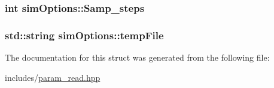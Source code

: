 \subsubsection[{\texorpdfstring{Samp\+\_\+steps}{Samp_steps}}]{\setlength{\rightskip}{0pt plus 5cm}int sim\+Options\+::\+Samp\+\_\+steps}\hypertarget{structsimOptions_a5890487eea2252d4d84f67615269128f}{}\label{structsimOptions_a5890487eea2252d4d84f67615269128f}
\subsubsection[{\texorpdfstring{temp\+File}{tempFile}}]{\setlength{\rightskip}{0pt plus 5cm}std\+::string sim\+Options\+::temp\+File}\hypertarget{structsimOptions_a42a20f246c7029967d29a15e4d5aac16}{}\label{structsimOptions_a42a20f246c7029967d29a15e4d5aac16}


The documentation for this struct was generated from the following file\+:\begin{DoxyCompactItemize}
\item 
includes/\hyperlink{param__read_8hpp}{param\+\_\+read.\+hpp}\end{DoxyCompactItemize}
